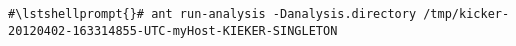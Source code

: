 \begin{lstlisting}[caption=Command to compile and run the instrumented Bookstore via ant]
#\lstshellprompt{}# ant run-analysis -Danalysis.directory /tmp/kicker-20120402-163314855-UTC-myHost-KIEKER-SINGLETON
\end{lstlisting}%
